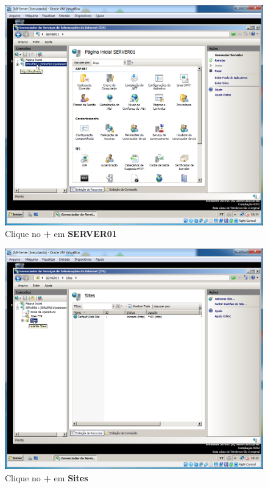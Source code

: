 \documentclass[10pt]{article}
\begin{document}
\begin{figure}[H]
    \centering
    \caption{Clique no \textbf{+} em \textbf{SERVER01}}
    \label{fig:5532036}
    \includegraphics[width=\linewidth]{images/IIS/criando_um_novo_site/036.png}
\end{figure}
\begin{figure}[H]
    \centering
    \caption{Clique no \textbf{+} em \textbf{Sites}}
    \label{fig:5532037}
    \includegraphics[width=\linewidth]{images/IIS/criando_um_novo_site/037.png}
\end{figure}
\end{document}
